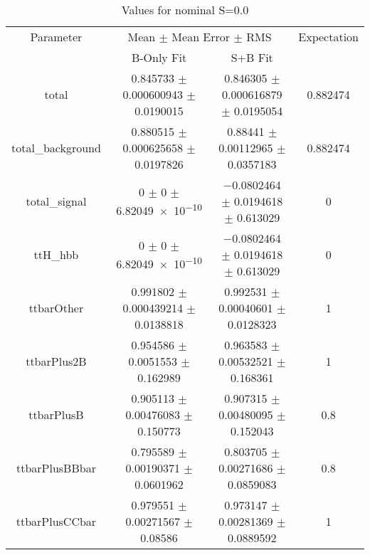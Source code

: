 \begin{table}
\centering
\caption{Values for nominal S=0.0}
\begin{tabular}{cccc}
\toprule
Parameter & \multicolumn{2}{c}{Mean $\pm$ Mean Error $\pm$ RMS} & Expectation\\
 & B-Only Fit & S+B Fit & \\
\midrule
total & \num{0.845733} $\pm$ \num{0.000600943} $\pm$ \num{0.0190015} & \num{0.846305} $\pm$ \num{0.000616879} $\pm$ \num{0.0195054} & \num{0.882474}\\
total\_background & \num{0.880515} $\pm$ \num{0.000625658} $\pm$ \num{0.0197826} & \num{0.88441} $\pm$ \num{0.00112965} $\pm$ \num{0.0357183} & \num{0.882474}\\
total\_signal & \num{0} $\pm$ \num{0} $\pm$ \num{6.82049e-10} & \num{-0.0802464} $\pm$ \num{0.0194618} $\pm$ \num{0.613029} & \num{0}\\
ttH\_hbb & \num{0} $\pm$ \num{0} $\pm$ \num{6.82049e-10} & \num{-0.0802464} $\pm$ \num{0.0194618} $\pm$ \num{0.613029} & \num{0}\\
ttbarOther & \num{0.991802} $\pm$ \num{0.000439214} $\pm$ \num{0.0138818} & \num{0.992531} $\pm$ \num{0.00040601} $\pm$ \num{0.0128323} & \num{1}\\
ttbarPlus2B & \num{0.954586} $\pm$ \num{0.0051553} $\pm$ \num{0.162989} & \num{0.963583} $\pm$ \num{0.00532521} $\pm$ \num{0.168361} & \num{1}\\
ttbarPlusB & \num{0.905113} $\pm$ \num{0.00476083} $\pm$ \num{0.150773} & \num{0.907315} $\pm$ \num{0.00480095} $\pm$ \num{0.152043} & \num{0.8}\\
ttbarPlusBBbar & \num{0.795589} $\pm$ \num{0.00190371} $\pm$ \num{0.0601962} & \num{0.803705} $\pm$ \num{0.00271686} $\pm$ \num{0.0859083} & \num{0.8}\\
ttbarPlusCCbar & \num{0.979551} $\pm$ \num{0.00271567} $\pm$ \num{0.08586} & \num{0.973147} $\pm$ \num{0.00281369} $\pm$ \num{0.0889592} & \num{1}\\
\bottomrule
\end{tabular}
\end{table}